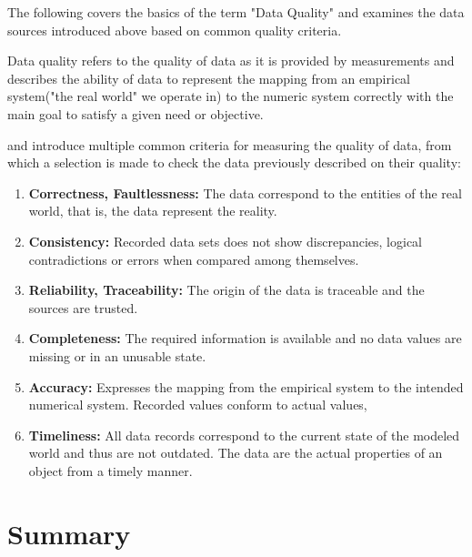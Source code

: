 The following covers the basics of the term "Data Quality" and examines the data sources
introduced above based on common quality criteria.

Data quality refers to the quality of data as it is provided by measurements and describes the
ability of data to represent the mapping from an empirical system("the real world" we operate in)
to the numeric system correctly with the main goal to satisfy a given need or objective. \cite{Ebert07}

\cite{Daqua13} and  \cite{Ebert07} introduce multiple common criteria for measuring the quality of data,
from which a selection is made to check the data previously described on their quality:

\begin{enumerate}
    \item \textbf{Correctness, Faultlessness:}
    The data correspond to the entities of the real world, that is, the data represent the reality.

    \item \textbf{Consistency:}
    Recorded data sets does not show discrepancies, logical contradictions or errors when compared
    among themselves.

    \item \textbf{Reliability, Traceability:}
    The origin of the data is traceable and the sources are trusted.

    \item \textbf{Completeness:}
    The required information is available and no data values are missing or in an unusable state.

    \item \textbf{Accuracy:}
    Expresses the mapping from the empirical system to the intended numerical system. Recorded values
    conform to actual values,

    \item \textbf{Timeliness:}
    All data records correspond to the current state of the modeled world and thus are not outdated.
    The data are the actual properties of an object from a timely manner.
\end{enumerate}


%

\section{Summary}

